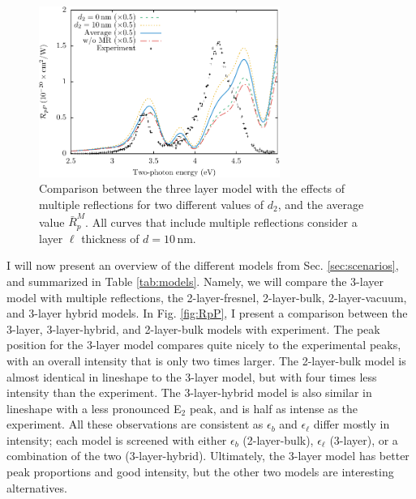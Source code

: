 \begin{figure}[H]
\centering
\includegraphics[width=0.7\textwidth]{content/figures/fig-Si1x1-MRdepth}
\caption{Comparison between the three layer model with the effects of multiple
reflections for two different values of $d_{2}$, and the average value
$\bar{R}^{M}_{p}$. All curves that include multiple reflections consider a layer
$\ell$ thickness of $d = 10\,\mathrm{nm}$.}
\label{fig:d2values}
\end{figure}

I will now present an overview of the different models from Sec.
\ref{sec:scenarios}, and summarized in Table \ref{tab:models}. Namely, we will
compare the 3-layer model with multiple reflections, the 2-layer-fresnel,
2-layer-bulk, 2-layer-vacuum, and 3-layer hybrid models. In Fig. \ref{fig:RpP},
I present a comparison between the 3-layer, 3-layer-hybrid, and 2-layer-bulk
models with experiment. The peak position for the 3-layer model compares quite
nicely to the experimental peaks, with an overall intensity that is only two
times larger. The 2-layer-bulk model is almost identical in lineshape to the
3-layer model, but with four times less intensity than the experiment. The
3-layer-hybrid model is also similar in lineshape with a less pronounced E$_{2}$
peak, and is half as intense as the experiment. All these observations are
consistent as $\epsilon_{b}$ and $\epsilon_{\ell}$ differ mostly in intensity;
each model is screened with either $\epsilon_{b}$ (2-layer-bulk),
$\epsilon_{\ell}$ (3-layer), or a combination of the two (3-layer-hybrid).
Ultimately, the 3-layer model has better peak proportions and good intensity,
but the other two models are interesting alternatives.

